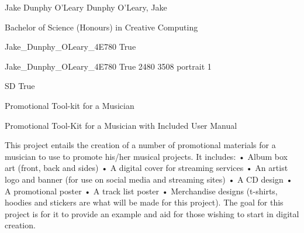 \documentclass[twoside]{report}
\begin{document}
\begingroup{}\relax



\def\Key{Jake_Dunphy_OLeary_4E780}

{Jake Dunphy O'Leary}
{Dunphy O'Leary, Jake}

{Bachelor of Science (Honours) in Creative Computing}

{Jake_Dunphy_OLeary_4E780}
{True}

{Jake_Dunphy_OLeary_4E780}
{True}
{2480}
{3508}
{portrait}
{1}

{SD}
{True}

{Promotional Tool-kit for a Musician}

{Promotional Tool-Kit for a Musician with Included User Manual}

{This project entails the creation of a number of promotional materials for a musician to use to promote his/her musical projects. It includes:
•	Album box art (front, back and sides)
•	A digital cover for streaming services
•	An artist logo and banner (for use on social media and streaming sites)
•	A CD design
•	A promotional poster
•	A track list poster
•	Merchandise designs (t-shirts, hoodies and stickers are what will be made for this project).
The goal for this project is for it to provide an example and aid for those wishing to start in digital creation.}
\end{document}
